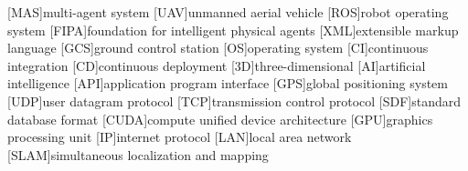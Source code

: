 \begin{acronym}[Foundation]
    [MAS]{multi-agent system}
    [UAV]{unmanned aerial vehicle}
    [ROS]{robot operating system}
    [FIPA]{foundation for intelligent physical agents}
    [XML]{extensible markup language}
    [GCS]{ground control station}
    [OS]{operating system}
    [CI]{continuous integration}
    [CD]{continuous deployment}
    [3D]{three-dimensional}
    [AI]{artificial intelligence}
    [API]{application program interface}
    [GPS]{global positioning system}
    [UDP]{user datagram protocol}
    [TCP]{transmission control protocol}
    [SDF]{standard database format}
    [CUDA]{compute unified device architecture}
    [GPU]{graphics processing unit}
    [IP]{internet protocol}
    [LAN]{local area network}
    [SLAM]{simultaneous localization and mapping}
\end{acronym}